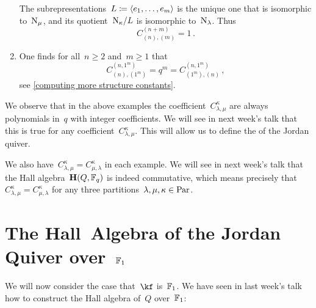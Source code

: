 \documentclass[a4paper,11pt]{scrartcl}
\begin{document}
\begin{example}
\begin{enumerate}
      The subrepresentations~$L \coloneqq \langle e_1, \dotsc, e_m\rangle$ is the unique one that is isomorphic to~$\mathrm{N}_\mu$, and its quotient~$\mathrm{N}_\kappa / L$ is isomorphic to~$\mathrm{N}_\lambda$.
      Thus
      \[
        C^{(n+m)}_{(n),(m)}
        =
        1 \,.
      \]
    \item
      One finds for all~$n \geq 2$ and~$m \geq 1$ that
      \[
        C^{(n, 1^m)}_{(n), (1^m)}
        =
        q^m
        =
        C^{(n, 1^m)}_{(1^m), (n)} \,,
      \]
      see \cref{computing more structure constants}.
  \end{enumerate}
  We observe that in the above examples the coefficient~$C^{\kappa}_{\lambda, \mu}$ are always polynomials in~$q$ with integer coefficients.
  We will see in next week’s talk that this is true for any coefficient~$C^{\kappa}_{\lambda, \mu}$.
  This will allow us to define the  of the Jordan quiver.

  We also have~$C^{\kappa}_{\lambda, \mu} = C^{\kappa}_{\mu, \lambda}$ in each example.
  We will see in next week’s talk that the Hall algebra~$\mathbf{H}(Q, \mathbb{F}_q)$ is indeed commutative, which means precisely that~$C^\kappa_{\lambda, \mu} = C^\kappa_{\mu, \lambda}$ for any three partitions~$\lambda, \mu, \kappa \in \mathrm{Par}$.
\end{example}





\section{The Hall~Algebra of the Jordan Quiver over~$\mathbb{F}_1$}

We will now consider the case that~$\kf$ is~$\mathbb{F}_1$.
We have seen in last week’s talk how to construct the Hall algebra of~$Q$ over~$\mathbb{F}_1$:
\end{document}

